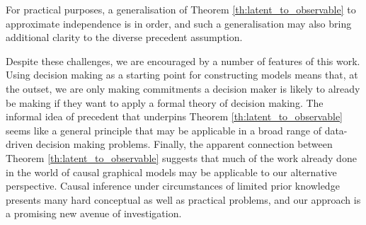 For practical purposes, a generalisation of Theorem \ref{th:latent_to_observable} to approximate independence is in order, and such a generalisation may also bring additional clarity to the diverse precedent assumption.

Despite these challenges, we are encouraged by a number of features of this work. Using decision making as a starting point for constructing models means that, at the outset, we are only making commitments a decision maker is likely to already be making if they want to apply a formal theory of decision making. The informal idea of precedent that underpins Theorem \ref{th:latent_to_observable} seems like a general principle that may be applicable in a broad range of data-driven decision making problems. Finally, the apparent connection between Theorem \ref{th:latent_to_observable} suggests that much of the work already done in the world of causal graphical models may be applicable to our alternative perspective. Causal inference under circumstances of limited prior knowledge presents many hard conceptual as well as practical problems, and our approach is a promising new avenue of investigation.